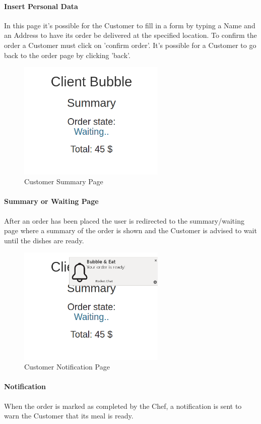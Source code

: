\paragraph{Insert Personal Data}
In this page it's possible for the Customer to fill in a form by typing a Name and an Address to have its order be delivered at the specified location. To confirm the order a Customer must click on 'confirm order'. 
It's possible for a Customer to go back to the order page by clicking 'back'.

\begin{figure}[H]
	\centering
	\includegraphics[width=7cm]{../../documenti/UserManualDemo/demo_screens/client_summary.png}
	\caption{Customer Summary Page}
\end{figure}
\paragraph{Summary or Waiting Page}
After an order has been placed the user is redirected to the summary/waiting page where a summary of the order is shown and the Customer is advised to wait until the dishes are ready.

\begin{figure}[H]
	\centering
	\includegraphics[width=7cm]{../../documenti/UserManualDemo/demo_screens/client_notification.png}
	\caption{Customer Notification Page}
\end{figure}
\paragraph{Notification}
When the order is marked as completed by the Chef, a notification is sent to warn the Customer that its meal is ready.

